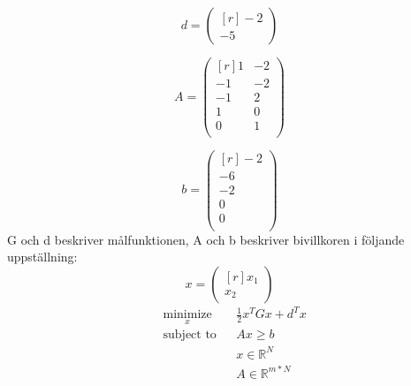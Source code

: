   \[
 d=
\begin{pmatrix*}[r]
  -2  \\
  -5 
\end{pmatrix*}
\]

  \[
 A=
\begin{pmatrix*}[r]
  1 & -2  \\
  -1 & -2  \\
  -1 & 2  \\
  1 & 0  \\
 0 & 1  \\
\end{pmatrix*}
\]

  \[
 b=
\begin{pmatrix*}[r]
   -2  \\
   -6  \\
   -2  \\
   0  \\
 0   \\
\end{pmatrix*}
\]
G och d beskriver målfunktionen, A och b beskriver bivillkoren i följande uppställning:
  \[
 x=
\begin{pmatrix*}[r]
   x_1  \\
   x_2 
\end{pmatrix*}
\]
\newline
\begin{equation*}
\begin{aligned}
& \underset{x}{\text{minimize}}
& & \frac{1}{2} x^{T}Gx+d^{T}x \\
& \text{subject to}
& & Ax\geq b \\
& && x \in \mathbb{R}^N \\
& && A \in \mathbb{R}^{m*N}
\end{aligned}
\end{equation*}

